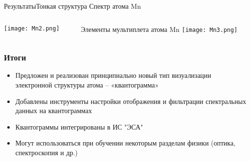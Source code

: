 \documentclass{beamer}
\begin{document}
\begin{frame}{Результаты}{Тонкая структура}
Спектр атома Mn
\begin{columns}
    \begin{column}{0.5\textwidth}
    \texttt{[image: Mn2.png]}
    \end{column}
    \begin{column}{0.5\textwidth}
    Элементы мультиплета атома Mn
    \texttt{[image: Mn3.png]}
    \end{column}
  \end{columns}
\end{frame}

\begin{frame}
\frametitle{Итоги}
    \begin{itemize}
        \item Предложен и реализован принципиально новый тип визуализации электронной структуры атома – «квантограмма»
        \item Добавлены инструменты настройки отображения и фильтрации спектральных данных на квантограммах
        \item Квантограммы интегрированы в ИС "ЭСА"
        \item Могут использоваться при обучении некоторым разделам физики (оптика, спектроскопия и др.)
    \end{itemize}
\end{frame}
\end{document}
